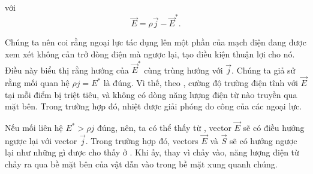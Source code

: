 \noindent
với
\begin{equation}\label{eq:15_32}
    \vec{E} = \rho \vec{j} - \vec{E}^*.
\end{equation}

\noindent


Chúng ta nên coi rằng ngoại lực tác dụng lên một phần của mạch điện đang được xem xét không cản trở dòng điện mà ngược lại, tạo điều kiện thuận lợi cho nó.
Điều này biểu thị rằng hướng của $\vec{E}^*$ cùng trùng hướng với $\vec{j}$.
Chúng ta giả sử rằng mối quan hệ $\rho j = E^*$ là đúng.
Vì thế, theo , cường độ trường điện tĩnh với $\vec{E}$ tại mỗi điểm bị triệt tiêu, và không có dòng năng lượng điện từ nào truyền qua mặt bên. 
Trong trường hợp đó, nhiệt được giải phóng do công của các ngoại lực.




Nếu mối liên hệ $E^*>\rho j$ đúng, nên, ta có thể thấy từ , vector $\vec{E}$ sẽ có điều hướng ngược lại với vector $\vec{j}$.
Trong trường hợp đó, vectors $\vec{E}$ và $\vec{S}$ sẽ có hướng ngược lại như những gì được cho thấy ở .
Khi ấy, thay vì chảy vào, năng lượng điện từ chảy ra qua bề mặt bên của vật dẫn vào trong bề mặt xung quanh chúng.


